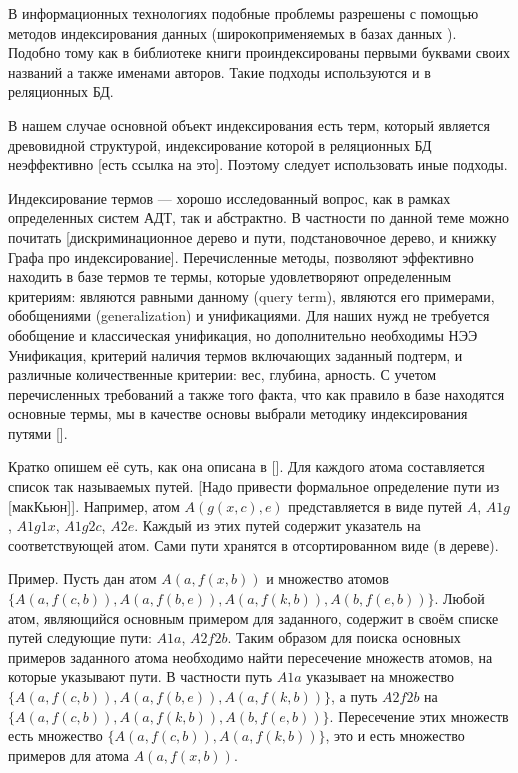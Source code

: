 В информационных технологиях подобные проблемы разрешены с помощью методов индексирования данных (широкоприменяемых в базах данных \cite{Ulman}). Подобно тому как в библиотеке книги проиндексированы первыми буквами своих названий а также именами авторов. Такие подходы используются и в реляционных БД. 

В нашем случае основной объект индексирования есть терм, который является древовидной структурой, индексирование которой в реляционных БД неэффективно [есть ссылка на это]. Поэтому следует использовать иные подходы. 

Индексирование термов --- хорошо исследованный вопрос, как в рамках определенных систем АДТ, так и абстрактно. В частности по данной теме можно почитать [дискриминационное дерево и пути, подстановочное дерево, и книжку Графа про индексирование]. 
Перечисленные методы, позволяют эффективно находить в базе термов те термы, которые удовлетворяют определенным критериям: являются равными данному (query term), являются его примерами, обобщениями (generalization) и унификациями. 
Для наших нужд не требуется обобщение и классическая унификация, но дополнительно необходимы НЭЭ Унификация, критерий наличия термов включающих заданный подтерм, и различные количественные критерии: вес, глубина, арность. С учетом перечисленных требований а также того факта, что как правило в базе находятся основные термы, мы в качестве основы выбрали методику индексирования путями [].

Кратко опишем её суть, как она описана в []. Для каждого атома составляется список так называемых путей. [Надо привести формальное определение пути из [макКьюн]]. Например, атом $A(g(x,c),e)$ представляется в виде путей $A$, $A1g$, $A1g1x$, $A1g2c$, $A2e$. Каждый из этих путей содержит указатель на соответствующей атом. Сами пути хранятся в отсортированном виде (в дереве). 

Пример. Пусть дан атом $A(a,f(x,b))$ и множество атомов $\{A(a,f(c,b)), A(a,f(b,e)),A(a,f(k,b)), A(b,f(e,b))\}$. Любой атом, являющийся основным примером для заданного, содержит в своём списке путей следующие пути: $A1a$, $A2f2b$. Таким образом для поиска основных примеров заданного атома необходимо найти пересечение множеств атомов, на которые указывают пути.  В частности путь $A1a$ указывает на множество $\{A(a,f(c,b)), A(a,f(b,e)),A(a,f(k,b))\}$, а путь $A2f2b$ на $\{A(a,f(c,b)), A(a,f(k,b)), A(b,f(e,b))\}$. Пересечение этих множеств есть множество $\{A(a,f(c,b)),A(a,f(k,b))\}$, это и есть множество примеров для атома $A(a,f(x,b))$.

